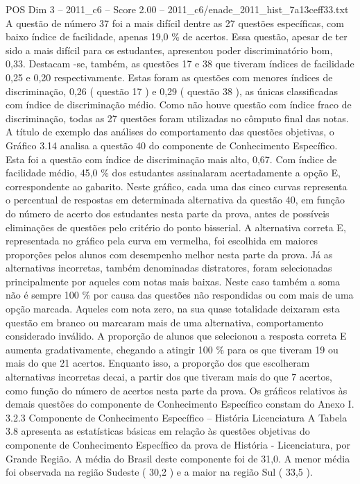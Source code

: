 \begin{textsample}{POS Dim 3 – 2011\_c6 – Score 2.00 – 2011\_c6/enade\_2011\_hist\_7a13ceff33.txt}
A questão de número 37 foi a mais difícil dentre as 27 questões específicas, com baixo índice de facilidade, apenas 19,0 \% de acertos.
Essa questão, apesar de ter sido a mais difícil para os estudantes, apresentou poder discriminatório bom, 0,33.
Destacam -se, também, as questões 17 e 38 que tiveram índices de facilidade 0,25 e 0,20 respectivamente.
Estas foram as questões com menores índices de discriminação, 0,26 ( questão 17 ) e 0,29 ( questão 38 ), as únicas classificadas com índice de discriminação médio.
Como não houve questão com índice fraco de discriminação, todas as 27 questões foram utilizadas no cômputo final das notas.
A título de exemplo das análises do comportamento das questões objetivas, o Gráfico 3.14 analisa a questão 40 do componente de Conhecimento Específico.
Esta foi a questão com índice de discriminação mais alto, 0,67.
Com índice de facilidade médio, 45,0 \% dos estudantes assinalaram acertadamente a opção E, correspondente ao gabarito.
Neste gráfico, cada uma das cinco curvas representa o percentual de respostas em determinada alternativa da questão 40, em função do número de acerto dos estudantes nesta parte da prova, antes de possíveis eliminações de questões pelo critério do ponto bisserial.
A alternativa correta E, representada no gráfico pela curva em vermelha, foi escolhida em maiores proporções pelos alunos com desempenho melhor nesta parte da prova.
Já as alternativas incorretas, também denominadas distratores, foram selecionadas principalmente por aqueles com notas mais baixas.
Neste caso também a soma não é sempre 100 \% por causa das questões não respondidas ou com mais de uma opção marcada.
Aqueles com nota zero, na sua quase totalidade deixaram esta questão em branco ou marcaram mais de uma alternativa, comportamento considerado inválido.
A proporção de alunos que selecionou a resposta correta E aumenta gradativamente, chegando a atingir 100 \% para os que tiveram 19 ou mais do que 21 acertos.
Enquanto isso, a proporção dos que escolheram alternativas incorretas decai, a partir dos que tiveram mais do que 7 acertos, como função do número de acertos nesta parte da prova.
Os gráficos relativos às demais questões do componente de Conhecimento Específico constam do Anexo I. 3.2.3 Componente de Conhecimento Específico – História Licenciatura A Tabela 3.8 apresenta as estatísticas básicas em relação às questões objetivas do componente de Conhecimento Específico da prova de História - Licenciatura, por Grande Região.
A média do Brasil deste componente foi de 31,0.
A menor média foi observada na região Sudeste ( 30,2 ) e a maior na região Sul ( 33,5 ).

\end{textsample}
